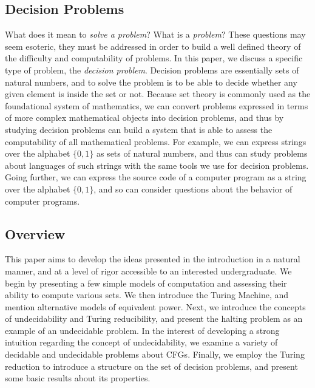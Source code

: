 \documentclass[psamsfonts]{amsart}
\theoremstyle{definition}
\theoremstyle{remark}
\numberwithin{equation}{section}
\begin{document}
\subsection{Decision Problems}
What does it mean to \emph{solve a problem}? What is a \emph{problem}?
These questions may seem esoteric, they must be addressed in order to build a
well defined theory of the difficulty and computability of problems. In this paper, we discuss a
specific type of problem, the \emph{decision problem}. Decision problems are
essentially sets of natural numbers, and to solve the problem is to be able to
decide whether any given element is inside the set or not. Because set theory is
commonly used as the foundational system of mathematics, we can convert problems
expressed in terms of more complex mathematical objects into decision problems,
and thus by studying decision problems can build a system that is able to assess
the computability of all mathematical problems. For example, we can express
strings over the alphabet $\{0,1\}$ as sets of natural numbers, and thus can
study problems about languages of such strings with the same tools we use for
decision problems. Going further, we can express the source code of a computer
program as a string over the alphabet $\{0,1\}$, and so can consider questions
about the behavior of computer programs.

\subsection{Overview}
This paper aims to develop the ideas presented in the introduction in a natural
manner, and at a level of rigor accessible to an interested undergraduate. We
begin by presenting a few simple models of computation and assessing their
ability to compute various sets. We then introduce the Turing Machine, and
mention alternative models of equivalent power. Next, we introduce the concepts
of undecidability and Turing reducibility, and present the halting problem as an
example of an undecidable problem. In the interest of developing a strong
intuition regarding the concept of undecidability, we examine a variety of
decidable and undecidable problems about \aclp{CFG}. Finally, we employ the
Turing reduction to introduce a structure on the set of decision problems, and
present some basic results about its properties.
\end{document}
